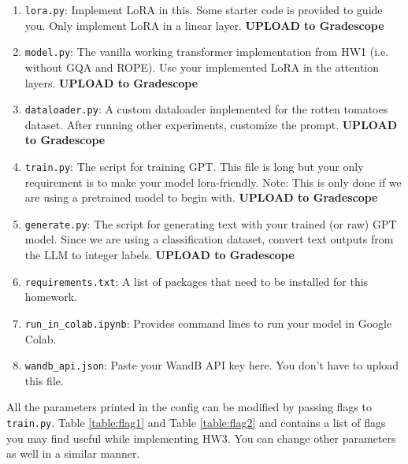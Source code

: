 \documentclass[11pt,addpoints,answers]{exam}
\begin{document}
\begin{questions}
\begin{enumerate}
    \item \lstinline{lora.py}: Implement LoRA in this. Some starter code is provided to guide you. Only implement LoRA in a linear layer. \textbf{UPLOAD to Gradescope}

    \item \lstinline{model.py}: The vanilla working transformer implementation from HW1 (i.e. without GQA and ROPE). Use your implemented LoRA in the attention layers. \textbf{UPLOAD to Gradescope}

    \item \lstinline{dataloader.py}: A custom dataloader implemented for the rotten tomatoes dataset. After running other experiments, customize the prompt. \textbf{UPLOAD to Gradescope}
    
    \item \lstinline{train.py}: The script for training GPT. This file is long but your only requirement is to make your model lora-friendly. Note: This is only done if we are using a pretrained model to begin with. \textbf{UPLOAD to Gradescope}
    
    \item \lstinline{generate.py}: The script for generating text with your trained (or raw) GPT model. Since we are using a classification dataset, convert text outputs from the LLM to integer labels. \textbf{UPLOAD to Gradescope}

    \item \lstinline{requirements.txt}: A list of packages that need to be installed for this homework.

    \item \lstinline{run_in_colab.ipynb}: Provides command lines to run your model in Google Colab. 

    \item \lstinline{wandb_api.json}: Paste your WandB API key here. You don't have to upload this file.

\end{enumerate}


All the parameters printed in the config can be modified by passing flags to \lstinline{train.py}. Table \ref{table:flag1} and Table \ref{table:flag2} and contains a list of flags you may find useful while implementing HW3. You can change other parameters as well in a similar manner.


\end{questions}
\end{document}

